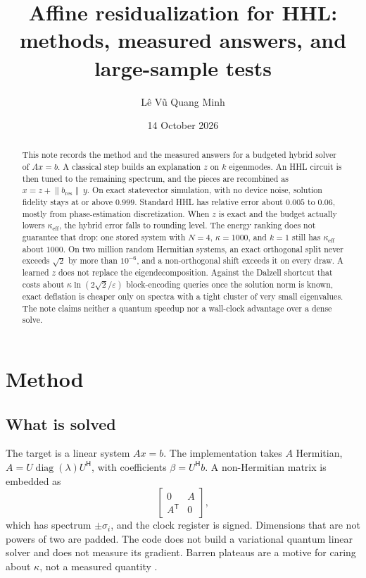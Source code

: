 \documentclass[11pt,a4paper]{article}
\title{Affine residualization for HHL:\\
methods, measured answers, and large-sample tests}
\author{L\^e V\~u Quang Minh}
\date{14 October 2026}
\begin{document}
\maketitle

\begin{abstract}
This note records the method and the measured answers for a budgeted hybrid solver of \(Ax=b\).
A classical step builds an explanation \(z\) on \(k\) eigenmodes.
An HHL circuit is then tuned to the remaining spectrum, and the pieces are recombined as \(x=z+\lVert b_{\mathrm{res}}\rVert\, y\).
On exact statevector simulation, with no device noise, solution fidelity stays at or above \(0.999\).
Standard HHL has relative error about \(0.005\) to \(0.06\), mostly from phase-estimation discretization.
When \(z\) is exact and the budget actually lowers \(\kappa_{\mathrm{eff}}\), the hybrid error falls to rounding level.
The energy ranking does not guarantee that drop: one stored system with \(N=4\), \(\kappa=1000\), and \(k=1\) still has \(\kappa_{\mathrm{eff}}\) about \(1000\).
On two million random Hermitian systems, an exact orthogonal split never exceeds \(\sqrt{2}\) by more than \(10^{-6}\), and a non-orthogonal shift exceeds it on every draw.
A learned \(z\) does not replace the eigendecomposition.
Against the Dalzell shortcut that costs about \(\kappa\ln(2\sqrt{2}/\varepsilon)\) block-encoding queries once the solution norm is known, exact deflation is cheaper only on spectra with a tight cluster of very small eigenvalues.
The note claims neither a quantum speedup nor a wall-clock advantage over a dense solve.
\end{abstract}

\section{Method}

\subsection{What is solved}
The target is a linear system \(Ax=b\).
The implementation takes \(A\) Hermitian, \(A=U\operatorname{diag}(\lambda)U^{\mathsf H}\), with coefficients \(\beta=U^{\mathsf H}b\).
A non-Hermitian matrix is embedded as
\[
\begin{bmatrix}0&A\\ A^{\mathsf T}&0\end{bmatrix},
\]
which has spectrum \(\pm\sigma_i\), and the clock register is signed.
Dimensions that are not powers of two are padded.
The code does not build a variational quantum linear solver and does not measure its gradient.
Barren plateaus are a motive for caring about \(\kappa\), not a measured quantity \citep{bravoprieto2023}.
\end{document}
